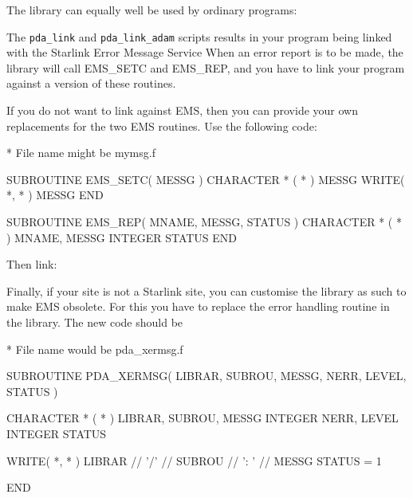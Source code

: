 \documentclass[11pt,twoside,nolof]{starlink}
\begin{document}
\begin{terminalv}
\end{terminalv}

   The library can equally well be used by ordinary programs:

\begin{terminalv}
\end{terminalv}

   The \texttt{pda\_link} and \texttt{pda\_link\_adam} scripts results in your
   program being linked with the Starlink Error Message Service
   When an error report is to
   be made, the library will call EMS\_SETC and EMS\_REP, and you have to
   link your program against a version of these routines.

   If you do not want to link against EMS, then you can provide your own
   replacements for the two EMS routines. Use the following code:

\begin{terminalv}
*  File name might be mymsg.f

      SUBROUTINE EMS_SETC( MESSG )
      CHARACTER * ( * ) MESSG
      WRITE( *, * ) MESSG
      END

      SUBROUTINE EMS_REP( MNAME, MESSG, STATUS )
      CHARACTER * ( * ) MNAME, MESSG
      INTEGER STATUS
      END
\end{terminalv}

   Then link:

\begin{terminalv}
\end{terminalv}

   Finally, if your site is not a Starlink site, you can
   customise the library as such to make EMS obsolete. For this you have
   to replace the error handling routine
   in the library. The new code should be

\begin{terminalv}
*  File name would be pda_xermsg.f

      SUBROUTINE PDA_XERMSG( LIBRAR, SUBROU, MESSG, NERR, LEVEL, STATUS )

      CHARACTER * ( * ) LIBRAR, SUBROU, MESSG
      INTEGER NERR, LEVEL
      INTEGER STATUS

      WRITE( *, * ) LIBRAR // '/' // SUBROU // ': ' // MESSG
      STATUS = 1

      END
\end{terminalv}
\end{document}
